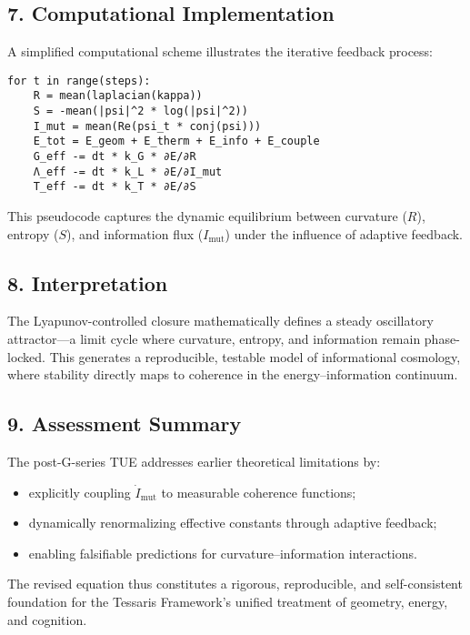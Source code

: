 \subsection*{7. Computational Implementation}
A simplified computational scheme illustrates the iterative feedback process:

\begin{verbatim}
for t in range(steps):
    R = mean(laplacian(kappa))
    S = -mean(|psi|^2 * log(|psi|^2))
    I_mut = mean(Re(psi_t * conj(psi)))
    E_tot = E_geom + E_therm + E_info + E_couple
    G_eff -= dt * k_G * ∂E/∂R
    Λ_eff -= dt * k_L * ∂E/∂I_mut
    T_eff -= dt * k_T * ∂E/∂S
\end{verbatim}

This pseudocode captures the dynamic equilibrium between curvature ($R$), entropy ($S$), and information flux ($I_{\text{mut}}$) under the influence of adaptive feedback.

\subsection*{8. Interpretation}
The Lyapunov-controlled closure mathematically defines a steady oscillatory attractor—a limit cycle where curvature, entropy, and information remain phase-locked.  
This generates a reproducible, testable model of informational cosmology, where stability directly maps to coherence in the energy–information continuum.

\subsection*{9. Assessment Summary}
The post-G-series TUE addresses earlier theoretical limitations by:
\begin{itemize}
  \item explicitly coupling $\dot{I}_{\text{mut}}$ to measurable coherence functions;
  \item dynamically renormalizing effective constants through adaptive feedback;
  \item enabling falsifiable predictions for curvature–information interactions.
\end{itemize}
The revised equation thus constitutes a rigorous, reproducible, and self-consistent foundation for the Tessaris Framework’s unified treatment of geometry, energy, and cognition.